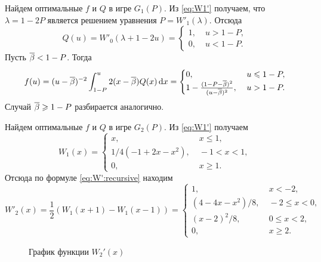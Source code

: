 {\begin{example}
  Найдем оптимальные $f$ и $Q$ в игре $G_1(P)$.
  Из \eqref{eq:W1'} получаем, что $\lambda = 1 - 2P$ является решением уравнения $P = W'_1(\lambda)$.
  Отсюда
  \begin{equation*}
    Q(u) = W'_0(\lambda + 1 - 2u) = \begin{cases}
      1, &\; u > 1 - P,\\
      0, &\; u < 1 - P.
    \end{cases}
  \end{equation*}
  Пусть ${\overline{\beta}} < 1 - P$.
  Тогда
  \begin{equation*}
    f(u) = (u - {\overline{\beta}})^{-2} \int_{1-P}^u 2 (x - {\overline{\beta}}) Q(x) \mathop{}\!\mathrm{d} x =
    \begin{cases}
      0, &\; u \leqslant 1 - P,\\
      1 - \frac{(1 - P - {\overline{\beta}})^2}{(u-{\overline{\beta}})^2}, &\; u > 1 - P.
    \end{cases}
  \end{equation*}
  Случай ${\overline{\beta}} \geqslant 1 - P$ разбирается аналогично.
\end{example}

\begin{example}
  Найдем оптимальные $f$ и $Q$ в игре $G_2(P)$.
  Из \eqref{eq:W1'} получаем
  \begin{equation*}
    W_1(x) = \begin{cases}
      x, &\; x \leqslant 1,\\
      1/4 (-1 + 2x - x^2), &\; -1 < x < 1,\\
      0, &\; x \geqslant 1.
    \end{cases}
  \end{equation*}
  Отсюда по формуле \eqref{eq:W':recursive} находим
  \begin{equation*}
    W'_2(x) = \frac{1}{2} \left( W_1(x+1) - W_1(x-1) \right) = \begin{cases}
      1, &\; x < -2,\\
      (4 - 4x - x^2)/8, &\; -2 \leqslant x < 0,\\
      (x - 2)^2/8, &\; 0 \leqslant x < 2,\\
      0, &\; x \geqslant 2.
    \end{cases}
  \end{equation*}

  \begin{figure}[h!]
    \centering 
    \caption{График функции $W_2'(x)$}
    \label{fig:w2}
  \end{figure}


\end{example}}

